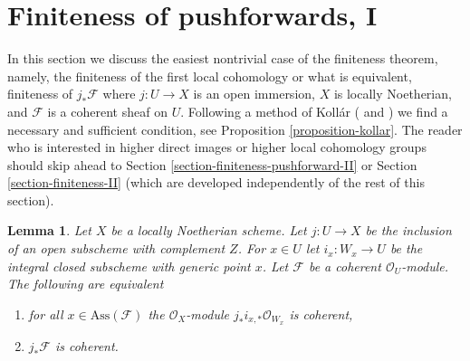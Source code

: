 \documentclass{stacks-project}
\theoremstyle{plain}
\newtheorem{lemma}[subsection]{Lemma}
\theoremstyle{definition}
\theoremstyle{remark}
\numberwithin{equation}{subsection}
\begin{document}
\section{Finiteness of pushforwards, I}
\label{section-finiteness-pushforward}

\noindent
In this section we discuss the easiest nontrivial case of the
finiteness theorem, namely, the finiteness of the first local
cohomology or what is equivalent, finiteness of $j_*\mathcal{F}$
where $j : U \to X$ is an open immersion, $X$ is locally Noetherian, and
$\mathcal{F}$ is a coherent sheaf on $U$. Following a method of Koll\'ar
(\cite{Kollar-variants} and \cite{Kollar-local-global-hulls})
we find a necessary and sufficient condition, see
Proposition \ref{proposition-kollar}. The reader who is interested
in higher direct images or higher local cohomology groups should skip
ahead to Section \ref{section-finiteness-pushforward-II} or
Section \ref{section-finiteness-II} (which are developed
independently of the rest of this section).

\begin{lemma}
\label{lemma-check-finiteness-pushforward-on-associated-points}
Let $X$ be a locally Noetherian scheme. Let $j : U \to X$ be the inclusion
of an open subscheme with complement $Z$. For $x \in U$ let
$i_x : W_x \to U$ be the integral closed subscheme with generic point $x$.
Let $\mathcal{F}$ be a coherent $\mathcal{O}_U$-module.
The following are equivalent
\begin{enumerate}
\item for all $x \in \text{Ass}(\mathcal{F})$ the
$\mathcal{O}_X$-module $j_*i_{x, *}\mathcal{O}_{W_x}$ is coherent,
\item $j_*\mathcal{F}$ is coherent.
\end{enumerate}
\end{lemma}
\end{document}

